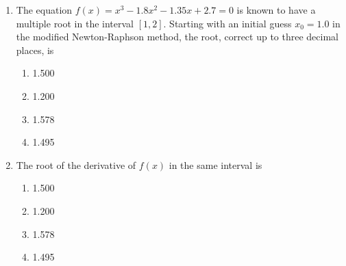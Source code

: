 \documentclass[journal,12pt,onecolumn]{IEEEtran}
\theoremstyle{remark}
\begin{document}
\begin{enumerate}
\begin{multicols}{4}
\begin{enumerate}
    \item 0.5626
    \item 0.5227
    \item 0.4847
    \item 0.4749
\end{enumerate}
\end{multicols}

\textbf{Linked Answer Questions: Q.31 to Q.34 carry two marks each.}

A modified Newton-Raphson method is used to find the roots of an equation $f(x) = 0$ which has multiple zeros at some point $x = p$ in the interval $[a, b]$. If the multiplicity $M$ of the root is known in advance, an iterative procedure for determining $p_{k+1}$ is given by
\begin{align*}
  p_{k+1} = p_k - M \frac{f(p_k)}{f'(p_k)} \quad \text{for} \quad k = 0, 1, 2, \dots  
\end{align*}\hfill{[GATE 2008]}

\item The equation $f(x) = x^3 - 1.8x^2 - 1.35x + 2.7 = 0$ is known to have a multiple root in the interval $[1, 2]$. Starting with an initial guess $x_0 = 1.0$ in the modified Newton-Raphson method, the root, correct up to three decimal places, is

\begin{multicols}{4}
\begin{enumerate}
    \item 1.500
    \item 1.200
    \item 1.578
    \item 1.495
\end{enumerate}
\end{multicols}

\item The root of the derivative of $f(x)$ in the same interval is

\begin{multicols}{4}
\begin{enumerate}
    \item 1.500
    \item 1.200
    \item 1.578
    \item 1.495
\end{enumerate}
\end{multicols}


\end{enumerate}
\end{document}
